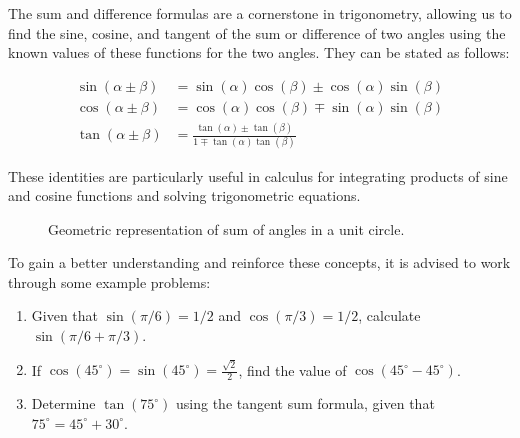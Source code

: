 \documentclass[a4paper,12pt]{book}
\newcounter{problem}
\newcounter{example}
\begin{document}
The sum and difference formulas are a cornerstone in trigonometry, allowing us to find the sine, cosine, and tangent of the sum or difference of two angles using the known values of these functions for the two angles. They can be stated as follows:

\begin{align*}
\sin(\alpha \pm \beta) &= \sin(\alpha)\cos(\beta) \pm \cos(\alpha)\sin(\beta) \\
\cos(\alpha \pm \beta) &= \cos(\alpha)\cos(\beta) \mp \sin(\alpha)\sin(\beta) \\
\tan(\alpha \pm \beta) &= \frac{\tan(\alpha) \pm \tan(\beta)}{1 \mp \tan(\alpha)\tan(\beta)}
\end{align*}

These identities are particularly useful in calculus for integrating products of sine and cosine functions and solving trigonometric equations.

\begin{figure}[htbp]
\centering
{}
\caption{Geometric representation of sum of angles in a unit circle.}
\label{fig:sum_of_angles}
\end{figure}

To gain a better understanding and reinforce these concepts, it is advised to work through some example problems:

\begin{enumerate}
    \item Given that $\sin(\pi/6) = 1/2$ and $\cos(\pi/3) = 1/2$, calculate $\sin(\pi/6 + \pi/3)$.
    \item If $\cos(45^\circ) = \sin(45^\circ) = \frac{\sqrt{2}}{2}$, find the value of $\cos(45^\circ - 45^\circ)$.
    \item Determine $\tan(75^\circ)$ using the tangent sum formula, given that $75^\circ = 45^\circ + 30^\circ$.
\end{enumerate}
\end{document}

